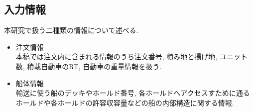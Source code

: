 \documentclass[a4j,11pt,twocolumn]{jsarticle}
\begin{document}
\subsection{入力情報}
本研究で扱う二種類の情報について述べる.
\begin{itemize}

\item 注文情報 \\
本稿では注文内に含まれる情報のうち注文番号, 積み地と揚げ地, ユニット数, 積載自動車のRT, 自動車の重量情報を扱う.

\item 船体情報 \\
輸送に使う船のデッキやホールド番号, 各ホールドへアクセスすために通るホールドや各ホールドの許容収容量などの船の内部構造に関する情報.

\end{itemize}
\end{document}
